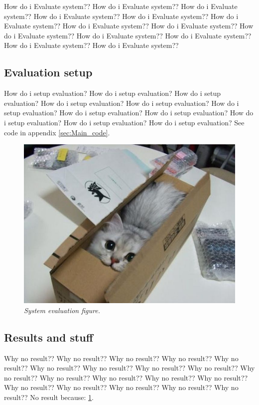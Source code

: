 How do i Evaluate system?? How do i Evaluate system?? How do i Evaluate system?? How do i Evaluate system?? How do i Evaluate system?? How do i Evaluate system?? How do i Evaluate system?? How do i Evaluate system?? How do i Evaluate system?? How do i Evaluate system?? How do i Evaluate system?? How do i Evaluate system?? How do i Evaluate system?? 

\subsection{Evaluation setup}
How do i setup evaluation? How do i setup evaluation? How do i setup evaluation? How do i setup evaluation? How do i setup evaluation? How do i setup evaluation? How do i setup evaluation? How do i setup evaluation? How do i setup evaluation? How do i setup evaluation? How do i setup evaluation? 
See code in appendix \ref{sec:Main_code}. %


\begin{figure}[htb]
	\centering
	\includegraphics[width=\linewidth]{images/acatisfinetoo}
	\caption{\textit{System evaluation figure.}}
	\label{fig:system_evaluation_fig} %
\end{figure}

\subsection{Results and stuff}
Why no result?? Why no result?? Why no result?? Why no result?? Why no result?? Why no result?? Why no result?? 
Why no result?? Why no result?? Why no result?? Why no result?? Why no result?? Why no result?? Why no result?? Why no result?? Why no result?? 
Why no result?? Why no result?? Why no result?? 
No result because: \ref{fig:system_evaluation_fig}. %


